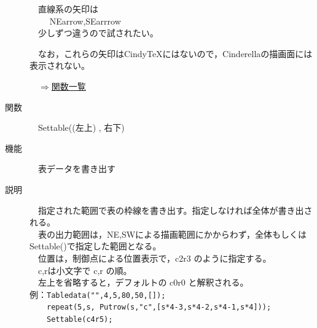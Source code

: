 \documentclass[papersize,a4paper,12pt,uplatex]{jsarticle}
\begin{document}
\begin{description}
　直線系の矢印は\\
　 　NEarrow,SEarrrow\\
　少しずつ違うので試されたい。

　なお，これらの矢印はCindyTeXにはないので，Cinderellaの描画面には表示されない。
　\\
\begin{flushright}　\hyperlink{functionlist}{$\Rightarrow$関数一覧}\end{flushright}

\hypertarget{settable}{}
\item[関数]　Settable((左上) , 右下)
\item[機能]　表データを書き出す
\item[説明]　指定された範囲で表の枠線を書き出す。指定しなければ全体が書き出される。\\
　表の出力範囲は，NE,SWによる描画範囲にかからわず，全体もしくはSettable()で指定した範囲となる。\\
　位置は，制御点による位置表示で，c2r3 のように指定する。\\
　c,rは小文字で c,r の順。\\
　左上を省略すると，デフォルトの c0r0 と解釈される。\\

例：\verb|Tabledata("",4,5,80,50,[]);|\\
　　\verb|repeat(5,s, Putrow(s,"c",[s*4-3,s*4-2,s*4-1,s*4]));|\\
　　\verb|Settable(c4r5);|\\


\end{description}
\end{document}
